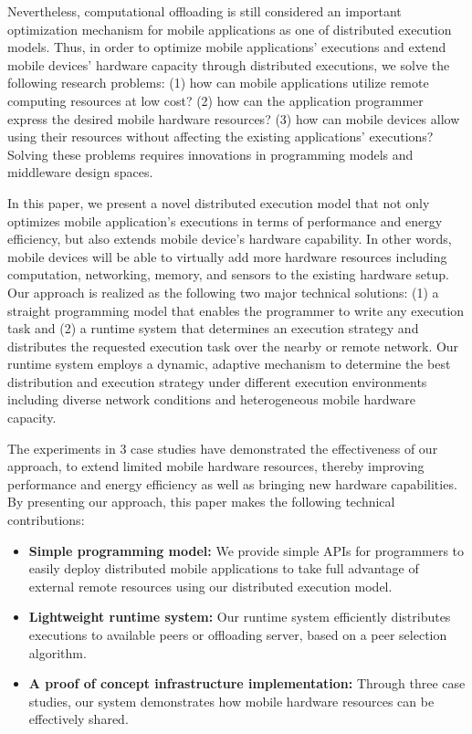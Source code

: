 \documentclass{sig-alternate}[10pt]
\begin{document}
Nevertheless, computational offloading is still considered an important optimization mechanism for mobile applications as one of distributed execution models. Thus, in order to optimize mobile applications' executions and extend mobile devices' hardware capacity through distributed executions, we solve the following research problems: (1) how can mobile applications utilize remote computing resources at low cost? (2) how can the application programmer express the desired mobile hardware resources? (3) how can mobile devices allow using their resources without affecting the existing applications' executions? Solving these problems requires innovations in programming models and middleware design spaces. 

In this paper, we present a novel distributed execution model that not only optimizes mobile application's executions in terms of performance and energy efficiency, but also extends mobile device's hardware capability. In other words, mobile devices will be able to virtually add more hardware resources including computation, networking, memory, and sensors to the existing hardware setup. Our approach is realized as the following two major technical solutions: (1) a straight programming model that enables the programmer to write any execution task and (2) a runtime system that determines an execution strategy and distributes the requested execution task over the nearby or remote network. Our runtime system employs a dynamic, adaptive mechanism to determine the best distribution and execution strategy under different execution environments including diverse network conditions and heterogeneous mobile hardware capacity.

The experiments in 3 case studies have demonstrated the effectiveness of our approach, to extend limited mobile hardware resources, thereby improving performance and energy efficiency as well as bringing new hardware capabilities. By presenting our approach, this paper makes the following technical contributions:
\begin{itemize}
	\item \textbf{Simple programming model:} We provide simple APIs for programmers to easily deploy distributed mobile applications to take full advantage of external remote resources using our distributed execution model.
	\item \textbf{Lightweight runtime system:} Our runtime system efficiently distributes executions to available peers or offloading server, based on a peer selection algorithm. 	
	\item \textbf{A proof of concept infrastructure implementation:} Through three case studies, our system demonstrates how mobile hardware resources can be effectively shared.
\end{itemize}
\end{document}
